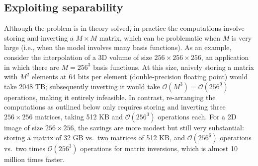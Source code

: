 \documentclass[10pt,twoside]{book}
\begin{document}
\subsection{Exploiting separability}

Although the problem is in theory solved, in practice the computations involve storing and inverting a $M \times M$ matrix, which can be problematic when $M$ is very large (i.e., when the model involves many basis functions). As an example, consider the interpolation of a 3D volume of size $256 \times 256 \times 256$, an application in which there are $M = 256^3$ basis functions. At this size, naively storing a matrix with $M^2$ elements at 64 bits per element (double-precision floating point) would take 
2048 TB; subsequently inverting it would take 
$\mathcal{O}( M^3 ) = \mathcal{O}( 256^9 )$ 
operations, making it entirely infeasible. 
In contrast, re-arranging the computations as outlined below only requires storing and inverting three $256 \times 256$ matrices, taking 
512 KB and 
$\mathcal{O}( 256^3 )$ operations each.
%
For a 2D image of size $256 \times 256$, the savings are more modest but still very substantial:
storing a matrix of 32 GB vs.~two matrices of 
512 KB,
and 
$\mathcal{O}( 256^6 )$ operations vs.~two times 
$\mathcal{O}( 256^3 )$ operations for matrix inversions, 
which is almost 10 million times faster.
\end{document}
